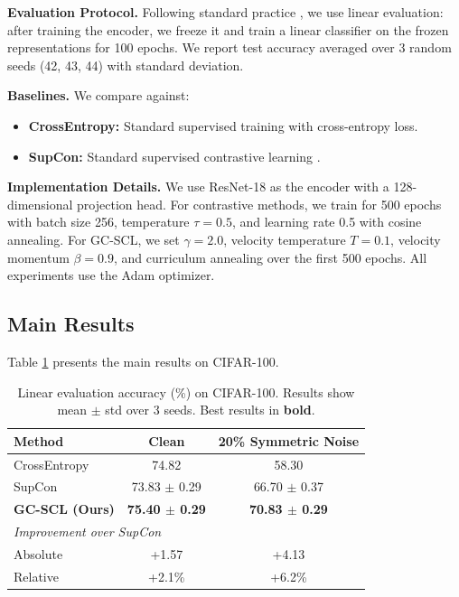 \documentclass{article}
\begin{document}
\textbf{Evaluation Protocol.} Following standard practice \citep{khosla2020supervised}, we use linear evaluation: after training the encoder, we freeze it and train a linear classifier on the frozen representations for 100 epochs. We report test accuracy averaged over 3 random seeds (42, 43, 44) with standard deviation.

\textbf{Baselines.} We compare against:
\begin{itemize}
    \item \textbf{CrossEntropy:} Standard supervised training with cross-entropy loss.
    \item \textbf{SupCon:} Standard supervised contrastive learning \citep{khosla2020supervised}.
\end{itemize}

\textbf{Implementation Details.} We use ResNet-18 as the encoder with a 128-dimensional projection head. For contrastive methods, we train for 500 epochs with batch size 256, temperature $\tau = 0.5$, and learning rate 0.5 with cosine annealing. For GC-SCL, we set $\gamma = 2.0$, velocity temperature $T = 0.1$, velocity momentum $\beta = 0.9$, and curriculum annealing over the first 500 epochs. All experiments use the Adam optimizer.

\subsection{Main Results}

Table \ref{tab:main} presents the main results on CIFAR-100.

\begin{table}[t]
\caption{Linear evaluation accuracy (\%) on CIFAR-100. Results show mean $\pm$ std over 3 seeds. Best results in \textbf{bold}.}
\label{tab:main}
\centering
\begin{tabular}{lcc}
\toprule
Method & Clean & 20\% Symmetric Noise \\
\midrule
CrossEntropy & 74.82 & 58.30 \\
SupCon & 73.83 $\pm$ 0.29 & 66.70 $\pm$ 0.37 \\
\textbf{GC-SCL (Ours)} & \textbf{75.40 $\pm$ 0.29} & \textbf{70.83 $\pm$ 0.29} \\
\midrule
\multicolumn{3}{l}{\textit{Improvement over SupCon}} \\
\hspace{1em} Absolute & +1.57 & +4.13 \\
\hspace{1em} Relative & +2.1\% & +6.2\% \\
\bottomrule
\end{tabular}
\end{table}
\end{document}
